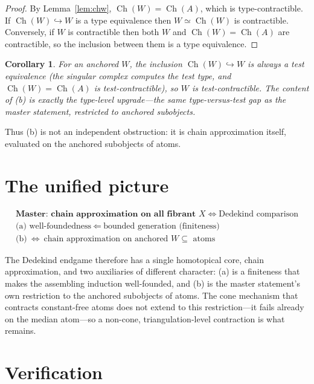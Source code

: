 \documentclass[11pt]{amsart}
\theoremstyle{plain}
\newtheorem{cor}[thm]{Corollary}
\theoremstyle{definition}
\newcommand{\Ch}{\operatorname{Ch}}
\begin{document}
\begin{proof}
  By Lemma~\ref{lem:chw}, $\Ch(W)=\Ch(A)$, which is type-contractible.
  If $\Ch(W)\hookrightarrow W$ is a type equivalence then $W\simeq\Ch(W)$
  is contractible.  Conversely, if $W$ is contractible then both $W$ and
  $\Ch(W)=\Ch(A)$ are contractible, so the inclusion between them is a
  type equivalence.
\end{proof}

\begin{cor}
  For an anchored $W$, the inclusion $\Ch(W)\hookrightarrow W$ is always
  a \emph{test} equivalence (the singular complex computes the test type,
  and $\Ch(W)=\Ch(A)$ is test-contractible), so $W$ is test-contractible.
  The content of \textup{(b)} is exactly the type-level upgrade---the
  same type-versus-test gap as the master statement, restricted to
  anchored subobjects.
\end{cor}

Thus (b) is not an independent obstruction: it is chain approximation
itself, evaluated on the anchored subobjects of atoms.

\section{The unified picture}

\[
  \boxed{\;
  \begin{array}{c}
  \textbf{Master: chain approximation on all fibrant }X
  \iff \text{Dedekind comparison}\\[4pt]
  \text{(a) well-foundedness}\ \Longleftarrow\ \text{bounded generation (finiteness)}\\[2pt]
  \text{(b)}\ \Longleftrightarrow\ \text{chain approximation on anchored }W\subseteq\text{ atoms}
  \end{array}
  \;}
\]

The Dedekind endgame therefore has a single homotopical core, chain
approximation, and two auxiliaries of different character: (a) is a
finiteness that makes the assembling induction well-founded, and (b) is
the master statement's own restriction to the anchored subobjects of
atoms.  The cone mechanism that contracts constant-free atoms does not
extend to this restriction---it fails already on the median atom---so a
non-cone, triangulation-level contraction is what remains.

\section{Verification}
\end{document}
